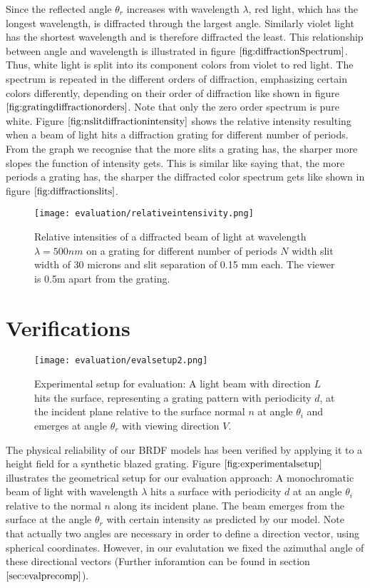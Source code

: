 Since the reflected angle $\theta_r$ increases with wavelength $\lambda$, red light, which has the longest wavelength, is diffracted through the largest angle. Similarly violet light has the shortest wavelength and is therefore diffracted the least. This relationship between angle and wavelength is illustrated in figure $\ref{fig:diffractionSpectrum}$. Thus, white light is split into its component colors from violet to red light. The spectrum is repeated in the different orders of diffraction, emphasizing certain colors differently, depending on their order of diffraction like shown in figure $\ref{fig:gratingdiffractionorders}$. Note that only the zero order spectrum is pure white.  
Figure $\ref{fig:nslitdiffractionintensity}$ shows the relative intensity resulting when a beam of light hits a diffraction grating for different number of periods. From the graph we recognise that the more slits a grating has, the sharper more slopes the function of intensity gets. This is similar like saying that, the more periods a grating has, the sharper the diffracted color spectrum gets like shown in figure $\ref{fig:diffractionslits}$. 

\begin{figure}[H]
  \centering
  \texttt{[image: evaluation/relativeintensivity.png]}
  \caption[Intensity Plots for Different Number of Slits]{Relative intensities of a diffracted beam of light at wavelength $\lambda=500nm$ on a grating for different number of periods $N$ width slit width of 30 microns and slit separation of 0.15 mm each. The viewer is 0.5m apart from the grating.}
  \label{fig:nslitdiffractionintensity}
\end{figure}

\section{Verifications}
\label{sec:approachesverifications}
\begin{figure}[H]
  \centering
  \texttt{[image: evaluation/evalsetup2.png]}
  \caption[Experimental Setup]{Experimental setup for evaluation: A light beam with direction $L$ hits the surface, representing a grating pattern with periodicity $d$, at the incident plane relative to the surface normal $n$ at angle $\theta_i$ and emerges at angle $\theta_r$ with viewing direction $V$.}
  \label{fig:experimentalsetup}
\end{figure}

The physical reliability of our BRDF models has been verified by applying it to a height field for a synthetic blazed grating. Figure $\ref{fig:experimentalsetup}$ illustrates the geometrical setup for our evaluation approach: A monochromatic beam of light with wavelength $\lambda$ hits a surface with periodicity $d$ at an angle $\theta_i$ relative to the normal $n$ along its incident plane. The beam emerges from the surface at the angle $\theta_r$ with certain intensity as predicted by our model. Note that actually two angles are necessary in order to define a direction vector, using spherical coordinates. However, in our evalutation we fixed the azimuthal angle of these directional vectors (Further inforamtion can be found in section $\ref{sec:evalprecomp}$). \\


